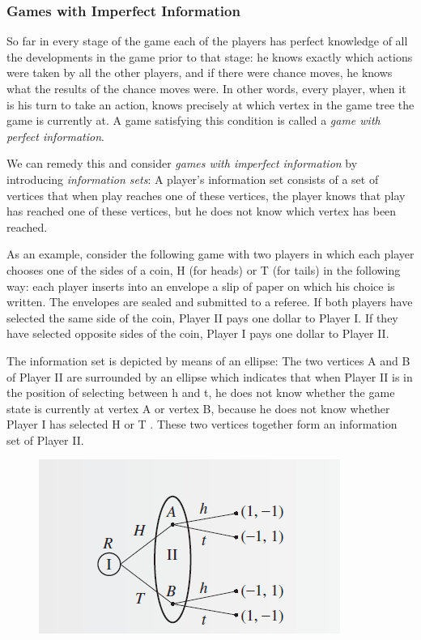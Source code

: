 \subsubsection{Games with Imperfect Information}

So far in every stage of the game each of the players has perfect knowledge of all the developments in the game prior to that stage: he knows exactly which actions were taken by all the other players, and if there were chance moves, he knows what the results of the chance moves were. In other words, every player, when it is his turn to take an action, knows precisely at which
vertex in the game tree the game is currently at. A game satisfying this condition is called a \emph{game with perfect information}.

We can remedy this and consider \emph{games with imperfect information} by introducing \emph{information sets}: A player’s information set consists of a set of vertices that when play reaches one of these vertices, the player knows that play has reached one of these vertices, but he does not know which vertex has been reached.

As an example, consider the following game with two players in which each player chooses one of the sides of a coin, H (for heads) or T (for tails) in the following way: each player inserts into an envelope a slip of paper on which his choice is written. The envelopes are sealed and submitted to a referee. If both players have selected the same side of the coin, Player II pays one dollar to Player I. If they have selected opposite sides of the coin, Player I pays one dollar to Player II.

The information set is depicted by means of an ellipse: The two vertices A and B of Player II are surrounded by an ellipse which indicates that when Player II is in the position of selecting between h and t, he does not know whether the game state is currently at vertex A or vertex B, because he does not know whether Player I has selected H or T . These two vertices together form an information set of Player II.

\begin{figure}[H]
    \centering
    \includegraphics[scale=1]{images/2023-10-10-game_theory_04.png}
\end{figure}


